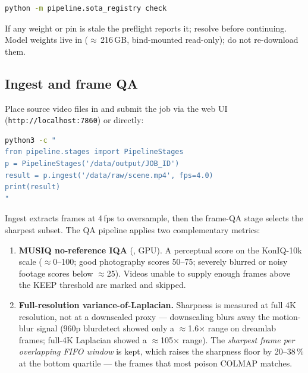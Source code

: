 \begin{lstlisting}[language=bash,caption={SOTA preflight}]
python -m pipeline.sota_registry check
\end{lstlisting}

\noindent If any weight or pin is stale the preflight reports it; resolve before
continuing.  Model weights live in  ($\approx$\,216\,GB,
bind-mounted read-only); do not re-download them.

\subsection{Ingest and frame QA}
\label{sec:pb-ingest}

Place source video files in  and submit the job via the web UI
(\texttt{http://localhost:7860}) or directly:

\begin{lstlisting}[language=bash,caption={Step 1 -- ingest and frame extraction}]
python3 -c "
from pipeline.stages import PipelineStages
p = PipelineStages('/data/output/JOB_ID')
result = p.ingest('/data/raw/scene.mp4', fps=4.0)
print(result)
"
\end{lstlisting}

\noindent Ingest extracts frames at 4\,fps to oversample, then the frame-QA
stage selects the sharpest subset.  The QA pipeline applies two complementary
metrics:

\begin{enumerate}
  \item \textbf{MUSIQ no-reference IQA} (, GPU).  A
        perceptual score on the KonIQ-10k scale ($\approx$0--100; good
        photography scores 50--75; severely blurred or noisy footage scores
        below $\approx$25).  Videos unable to supply enough frames above the
        KEEP threshold are marked  and skipped.
  \item \textbf{Full-resolution variance-of-Laplacian.}  Sharpness is measured
        at full 4K resolution, not at a downscaled proxy --- downscaling blurs
        away the motion-blur signal (960p blurdetect showed only a
        $\approx$1.6$\times$ range on dreamlab frames; full-4K Laplacian showed a
        $\approx$105$\times$ range).  The \emph{sharpest frame per overlapping
        FIFO window} is kept, which raises the sharpness floor by 20--38\,\% at
        the bottom quartile --- the frames that most poison COLMAP matches.
\end{enumerate}

